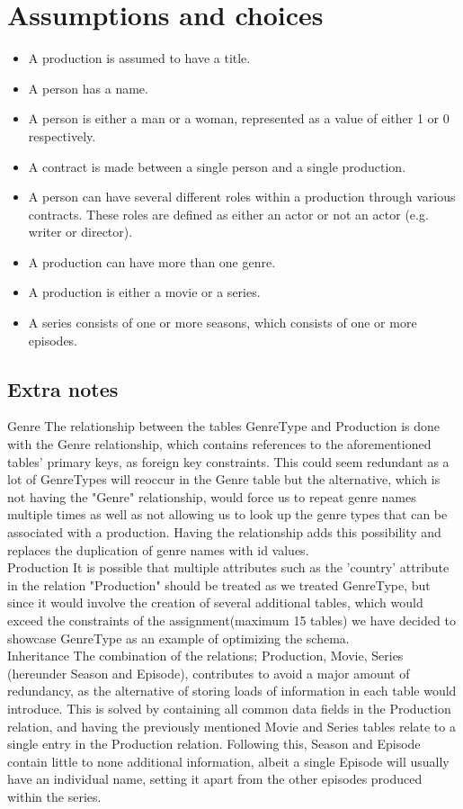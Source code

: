 \section{Assumptions and choices}
\begin{itemize}
	\item A production is assumed to have a title.
	\item A person has a name.
	\item A person is either a man or a woman, represented as a value of either 1 or 0 respectively.
	\item A contract is made between a single person and a single production.
	\item A person can have several different roles within a production through various contracts. These roles are defined as either an actor or not an actor (e.g. writer or director).
	\item A production can have more than one genre.
	\item A production is either a movie or a series.
	\item A series consists of one or more seasons, which consists of one or more episodes.
\end{itemize}
\subsection{Extra notes}
\large{Genre}\normalsize
The relationship between the tables GenreType and Production is done with the Genre relationship, which contains references to the aforementioned tables' primary keys, as foreign key constraints. This could seem redundant as a lot of GenreTypes will reoccur in the Genre table but the alternative, which is not having the "Genre" relationship, would force us to repeat genre names multiple times as well as not allowing us to look up the genre types that can be associated with a production. Having the relationship adds this possibility and replaces the duplication of genre names with id values.\\

\large{Production}\normalsize
It is possible that multiple attributes such as the 'country' attribute in the relation "Production" should be treated as we treated GenreType, but since it would involve the creation of several additional tables, which would exceed the constraints of the assignment(maximum 15 tables) we have decided to showcase GenreType as an example of optimizing the schema.\\

\large{Inheritance}\normalsize
The combination of the relations; Production, Movie, Series (hereunder Season and Episode), contributes to avoid a major amount of redundancy, as the alternative of storing loads of information in each table would introduce. This is solved by containing all common data fields in the Production relation, and having the previously mentioned Movie and Series tables relate to a single entry in the Production relation. Following this, Season and Episode contain little to none additional information, albeit a single Episode will usually have an individual name, setting it apart from the other episodes produced within the series.
